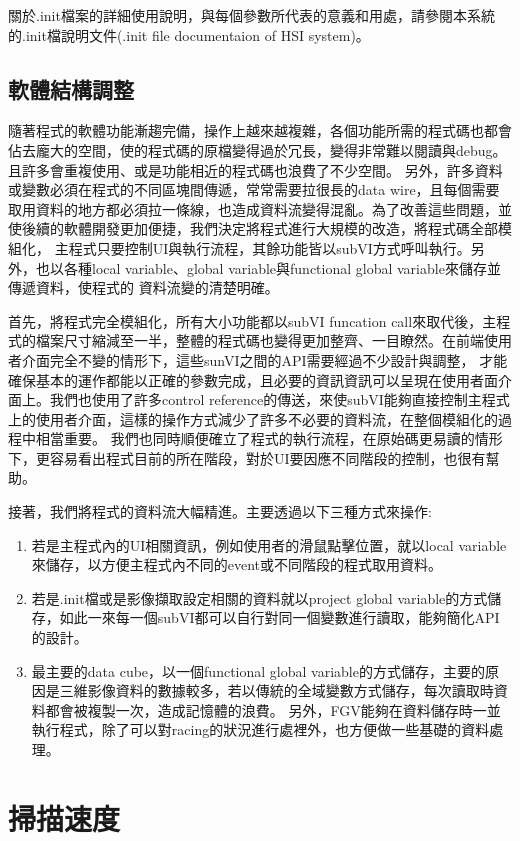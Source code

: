 \documentclass[12pt]{article}
\begin{document}
    關於.init檔案的詳細使用說明，與每個參數所代表的意義和用處，請參閱本系統的.init檔說明文件(.init file documentaion of HSI system)。
    \subsection{軟體結構調整}
    隨著程式的軟體功能漸趨完備，操作上越來越複雜，各個功能所需的程式碼也都會佔去龐大的空間，使的程式碼的原檔變得過於冗長，變得非常難以閱讀與debug。且許多會重複使用、或是功能相近的程式碼也浪費了不少空間。
    另外，許多資料或變數必須在程式的不同區塊間傳遞，常常需要拉很長的data wire，且每個需要取用資料的地方都必須拉一條線，也造成資料流變得混亂。為了改善這些問題，並使後續的軟體開發更加便捷，我們決定將程式進行大規模的改造，將程式碼全部模組化，
    主程式只要控制UI與執行流程，其餘功能皆以subVI方式呼叫執行。另外，也以各種local variable、global variable與functional global variable來儲存並傳遞資料，使程式的
    資料流變的清楚明確。
    
    首先，將程式完全模組化，所有大小功能都以subVI funcation call來取代後，主程式的檔案尺寸縮減至一半，整體的程式碼也變得更加整齊、一目瞭然。在前端使用者介面完全不變的情形下，這些sunVI之間的API需要經過不少設計與調整，
    才能確保基本的運作都能以正確的參數完成，且必要的資訊資訊可以呈現在使用者面介面上。我們也使用了許多control reference的傳送，來使subVI能夠直接控制主程式上的使用者介面，這樣的操作方式減少了許多不必要的資料流，在整個模組化的過程中相當重要。
    我們也同時順便確立了程式的執行流程，在原始碼更易讀的情形下，更容易看出程式目前的所在階段，對於UI要因應不同階段的控制，也很有幫助。

    接著，我們將程式的資料流大幅精進。主要透過以下三種方式來操作:
    \begin{enumerate}
        \item 若是主程式內的UI相關資訊，例如使用者的滑鼠點擊位置，就以local variable來儲存，以方便主程式內不同的event或不同階段的程式取用資料。
        \item 若是.init檔或是影像擷取設定相關的資料就以project global variable的方式儲存，如此一來每一個subVI都可以自行對同一個變數進行讀取，能夠簡化API的設計。
        \item 最主要的data cube，以一個functional global variable的方式儲存，主要的原因是三維影像資料的數據較多，若以傳統的全域變數方式儲存，每次讀取時資料都會被複製一次，造成記憶體的浪費。
        另外，FGV能夠在資料儲存時一並執行程式，除了可以對racing的狀況進行處裡外，也方便做一些基礎的資料處理。
    \end{enumerate}
    \section{掃描速度}
\end{document}
